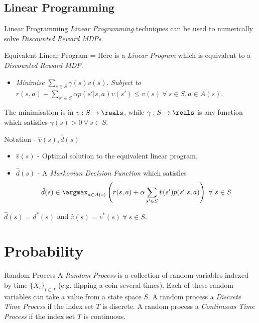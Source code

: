 \documentclass[11pt,a4paper]{article}
\begin{document}
\subsection*{Linear Programming}

  \begin{proposition}{Linear Programming}
    \textit{Linear Programming} techniques can be used to numerically solve \textit{Discounted Reward MDPs}.
  \end{proposition}

  \begin{proposition}{Equivalent Linear Program}
    \everymath={\displaystyle}
    Here is a \textit{Linear Program} which is equivalent to a \textit{Discounted Reward MDP}.
    \begin{itemize}
      \item \textit{Minimise} $\sum_{s\in S}\gamma(s)v(s)$.
      \itme \textit{Subject to} $r(s,a)+\sum_{s'\in S}\alpha p(s'|s,a)v(s')\leq v(s)\ \forall\ s\in S,a\in A(s)$.
    \end{itemize}
    The minimisation is in $v:S\to\reals$, while $\gamma:S\to\reals$ is any function which satisfies $\gamma(s)>0\ \forall\ s\in S$.
  \end{proposition}

  \begin{proposition}{Notation - $\hat{v}(s),\hat{d}(s)$}
    \begin{itemize}
      \item $\hat{v}(s)$ - Optimal solution to the equivalent linear program.
      \item $\hat{d}(s)$ - A \textit{Markovian Decision Function} which satisfies
      \[ \hat{d}(s)\in\argmax_{a\in A(s)}\left(r(s,a)+\alpha\sum_{s'\in S}\hat{v}(s')p(s'|s,a)\right)\ \forall\ s\in S \]
    \end{itemize}
  \end{proposition}

  \begin{theorem}{}
    $\hat{d}(s)=d^*(s)$ and $\hat{v}(s)=v^*(s)\ \forall\ s\in S$.
  \end{theorem}

\section{Probability}

  \begin{definition}{Random Process}
    A \textit{Random Process} is a collection of random variables indexed by time $\{X_t\}_{t\in T}$ (e.g. flipping a coin several times). Each of these random variables can take a value from a state space $S$. A random process a \textit{Discrete Time Process} if the index set $T$ is discrete. A random process a \textit{Continuous Time Process} if the index set $T$ is continuous.
  \end{definition}
\end{document}

